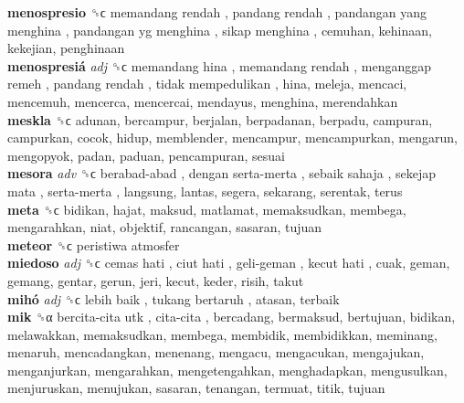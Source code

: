 \textbf{menospresio} ␝ϲ   memandang rendah ,  pandang rendah ,  pandangan yang menghina ,  pandangan yg menghina ,  sikap menghina , cemuhan, kehinaan, kekejian, penghinaan  \\
\textbf{menospresiá} \emph{adj}  ␝ϲ   memandang hina ,  memandang rendah ,  menganggap remeh ,  pandang rendah ,  tidak mempedulikan , hina, meleja, mencaci, mencemuh, mencerca, mencercai, mendayus, menghina, merendahkan  \\
\textbf{meskla} ␝ϲ  adunan, bercampur, berjalan, berpadanan, berpadu, campuran, campurkan, cocok, hidup, memblender, mencampur, mencampurkan, mengarun, mengopyok, padan, paduan, pencampuran, sesuai  \\
\textbf{mesora} \emph{adv}  ␝ϲ   berabad-abad ,  dengan serta-merta ,  sebaik sahaja ,  sekejap mata ,  serta-merta , langsung, lantas, segera, sekarang, serentak, terus  \\
\textbf{meta} ␝ϲ  bidikan, hajat, maksud, matlamat, memaksudkan, membega, mengarahkan, niat, objektif, rancangan, sasaran, tujuan  \\
\textbf{meteor} ␝ϲ   peristiwa atmosfer   \\
\textbf{miedoso} \emph{adj}  ␝ϲ   cemas hati ,  ciut hati ,  geli-geman ,  kecut hati , cuak, geman, gemang, gentar, gerun, jeri, kecut, keder, risih, takut  \\
\textbf{mihó} \emph{adj}  ␝ϲ   lebih baik ,  tukang bertaruh , atasan, terbaik  \\
\textbf{mik} ␝α   bercita-cita utk ,  cita-cita , bercadang, bermaksud, bertujuan, bidikan, melawakkan, memaksudkan, membega, membidik, membidikkan, meminang, menaruh, mencadangkan, menenang, mengacu, mengacukan, mengajukan, menganjurkan, mengarahkan, mengetengahkan, menghadapkan, mengusulkan, menjuruskan, menujukan, sasaran, tenangan, termuat, titik, tujuan  \\
